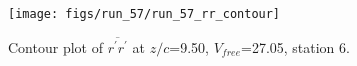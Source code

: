 \begin{figure}[H]
\centering
\texttt{[image: figs/run\_57/run\_57\_rr\_contour]}
\caption{Contour plot of $\overline{r^\prime r^\prime}$ at $z/c$=9.50, $V_{free}$=27.05, station 6.}
\end{figure}



